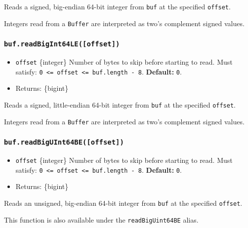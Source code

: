 Reads a signed, big-endian 64-bit integer from \texttt{buf} at the
specified \texttt{offset}.

Integers read from a \texttt{Buffer} are interpreted as two's complement
signed values.

\subsubsection{\texorpdfstring{\texttt{buf.readBigInt64LE({[}offset{]})}}{buf.readBigInt64LE({[}offset{]})}}\label{buf.readbigint64leoffset}

\begin{itemize}
\tightlist
\item
  \texttt{offset} \{integer\} Number of bytes to skip before starting to
  read. Must satisfy:
  \texttt{0\ \textless{}=\ offset\ \textless{}=\ buf.length\ -\ 8}.
  \textbf{Default:} \texttt{0}.
\item
  Returns: \{bigint\}
\end{itemize}

Reads a signed, little-endian 64-bit integer from \texttt{buf} at the
specified \texttt{offset}.

Integers read from a \texttt{Buffer} are interpreted as two's complement
signed values.

\subsubsection{\texorpdfstring{\texttt{buf.readBigUInt64BE({[}offset{]})}}{buf.readBigUInt64BE({[}offset{]})}}\label{buf.readbiguint64beoffset}

\begin{itemize}
\tightlist
\item
  \texttt{offset} \{integer\} Number of bytes to skip before starting to
  read. Must satisfy:
  \texttt{0\ \textless{}=\ offset\ \textless{}=\ buf.length\ -\ 8}.
  \textbf{Default:} \texttt{0}.
\item
  Returns: \{bigint\}
\end{itemize}

Reads an unsigned, big-endian 64-bit integer from \texttt{buf} at the
specified \texttt{offset}.

This function is also available under the \texttt{readBigUint64BE}
alias.

